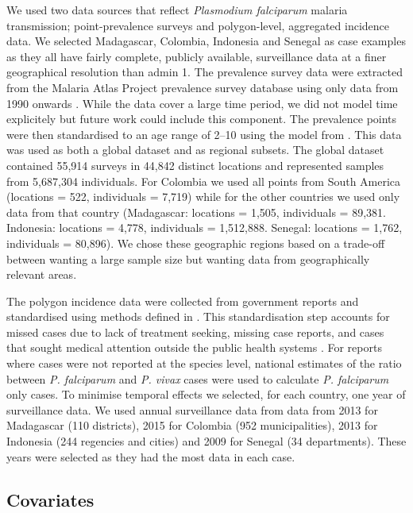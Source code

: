 \documentclass[review]{elsarticle}
\begin{document}
We used two data sources that reflect \emph{Plasmodium falciparum} malaria transmission; point-prevalence surveys and polygon-level, aggregated incidence data. 
We selected Madagascar, Colombia, Indonesia and Senegal as case examples as they all have fairly complete, publicly available, surveillance data at a finer geographical resolution than admin 1.
The prevalence survey data were extracted from the Malaria Atlas Project prevalence survey database using only data from 1990 onwards \citep{bhatt2015effect, guerra2007assembling, pfeffer2018ma}.
While the data cover a large time period, we did not model time explicitely but future work could include this component.
The prevalence points were then standardised to an age range of 2--10 using the model from \citep{smith2007standardizing}.
This data was used as both a global dataset and as regional subsets.
The global dataset contained 55,914 surveys in 44,842 distinct locations and represented samples from 5,687,304 individuals.
For Colombia we used all points from South America (locations = 522, individuals = 7,719) while for the other countries we used only data from that country (Madagascar: locations = 1,505, individuals = 89,381. Indonesia: locations = 4,778, individuals = 1,512,888. Senegal: locations = 1,762, individuals = 80,896).
We chose these geographic regions based on a trade-off between wanting a large sample size but wanting data from geographically relevant areas.

The polygon incidence data were collected from government reports and standardised using methods defined in \cite{cibulskis2011worldwide}.
This standardisation step accounts for missed cases due to lack of treatment seeking, missing case reports, and cases that sought medical attention outside the public health systems \citep{battle2016treatment}.
For reports where cases were not reported at the species level, national estimates of the ratio between \emph{P. falciparum} and \emph{P. vivax} cases were used to calculate \emph{P. falciparum} only cases. 
To minimise temporal effects we selected, for each country, one year of surveillance data. 
We used annual surveillance data from data from 2013 for Madagascar (110 districts), 2015 for Colombia (952 municipalities), 2013 for Indonesia (244 regencies and cities) and 2009 for Senegal (34 departments).
These years were selected as they had the most data in each case.


\subsection{Covariates}
\end{document}
